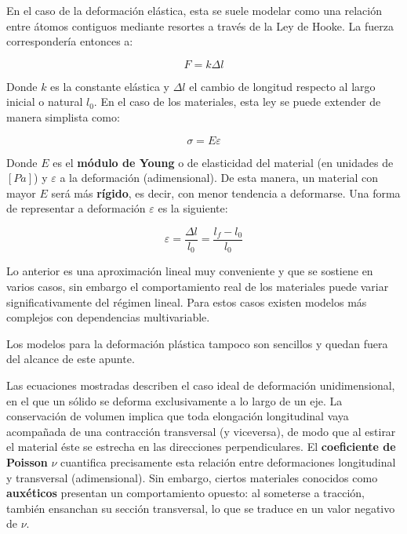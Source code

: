 En el caso de la deformación elástica, esta se suele modelar como una relación entre átomos contiguos mediante resortes a través de la Ley de Hooke. La fuerza correspondería entonces a:

\begin{equation}
    F=k\Delta l
\end{equation}

Donde $k$ es la constante elástica y $\Delta l$ el cambio de longitud respecto al largo inicial o natural $l_{0}$. En el caso de los materiales, esta ley se puede extender de manera simplista como:

\begin{equation}
    \sigma=E\varepsilon
\end{equation}

Donde $E$ es el \textbf{módulo de Young} o de elasticidad del material (en unidades de $[Pa]$) y $\varepsilon$ a la deformación (adimensional). De esta manera, un material con mayor $E$ será más \textbf{rígido}, es decir, con menor tendencia a deformarse. Una forma de representar a deformación $\varepsilon$ es la siguiente:

\begin{equation}
    \varepsilon = \frac{\Delta l}{l_{0}}=\frac{l_{f}-l_{0}}{l_{0}}
\end{equation}

Lo anterior es una aproximación lineal muy conveniente y que se sostiene en varios casos, sin embargo el comportamiento real de los materiales puede variar significativamente del régimen lineal. Para estos casos existen modelos más complejos con dependencias multivariable.

Los modelos para la deformación plástica tampoco son sencillos y quedan fuera del alcance de este apunte.

Las ecuaciones mostradas describen el caso ideal de deformación unidimensional, en el que un sólido se deforma exclusivamente a lo largo de un eje. La conservación de volumen implica que toda elongación longitudinal vaya acompañada de una contracción transversal (y viceversa), de modo que al estirar el material éste se estrecha en las direcciones perpendiculares. El \textbf{coeficiente de Poisson} $\nu$ cuantifica precisamente esta relación entre deformaciones longitudinal y transversal (adimensional). Sin embargo, ciertos materiales conocidos como \textbf{auxéticos} presentan un comportamiento opuesto: al someterse a tracción, también ensanchan su sección transversal, lo que se traduce en un valor negativo de $\nu$.

